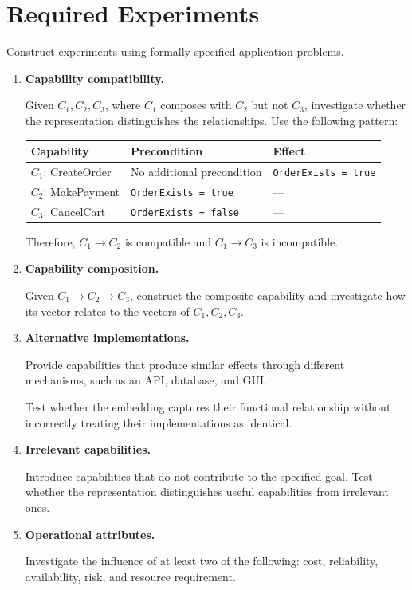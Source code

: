 \documentclass[11pt]{article}
\renewcommand{\arraystretch}{1.18}
\newcommand{\code}[1]{\texttt{#1}}
\begin{document}
\section{Required Experiments}

Construct experiments using formally specified application problems.

\begin{enumerate}[label=\textbf{\arabic*.},leftmargin=2em,itemsep=1.3em,topsep=0.7em]

\item \textbf{Capability compatibility.}

Given \(C_1,C_2,C_3\), where \(C_1\) composes with \(C_2\) but not \(C_3\), investigate
whether the representation distinguishes the relationships. Use the following pattern:

\begin{center}
\small
\renewcommand{\arraystretch}{1.25}
\begin{tabularx}{\linewidth}{@{}L{3.1cm}L{5.0cm}Y@{}}
\toprule
\textbf{Capability} & \textbf{Precondition} & \textbf{Effect} \\
\midrule
\(C_1\): CreateOrder & No additional precondition & \code{OrderExists = true} \\[0.55em]
\(C_2\): MakePayment & \code{OrderExists = true} & --- \\[0.55em]
\(C_3\): CancelCart & \code{OrderExists = false} & --- \\
\bottomrule
\end{tabularx}
\renewcommand{\arraystretch}{1.18}
\end{center}

Therefore, \(C_1\rightarrow C_2\) is compatible and
\(C_1\rightarrow C_3\) is incompatible.

\item \textbf{Capability composition.}

Given \(C_1\rightarrow C_2\rightarrow C_3\), construct the composite capability and
investigate how its vector relates to the vectors of \(C_1,C_2,C_3\).

\item \textbf{Alternative implementations.}

Provide capabilities that produce similar effects through different mechanisms, such as an
API, database, and GUI.

Test whether the embedding captures their functional relationship without incorrectly
treating their implementations as identical.

\item \textbf{Irrelevant capabilities.}

Introduce capabilities that do not contribute to the specified goal. Test whether the
representation distinguishes useful capabilities from irrelevant ones.

\item \textbf{Operational attributes.}

Investigate the influence of at least two of the following: cost, reliability, availability,
risk, and resource requirement.

\end{enumerate}
\end{document}
